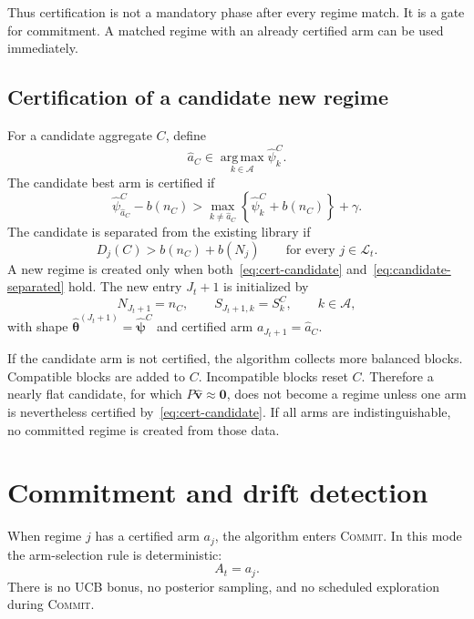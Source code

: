 \documentclass[11pt]{article}
\newcommand{\A}{\mathcal A}
\newcommand{\Lcal}{\mathcal L}
\newcommand{\argmax}{\operatorname*{arg\,max}}
\newcommand{\COMMIT}{\textsc{Commit}}
\begin{document}
Thus certification is not a mandatory phase after every regime match. It is a gate for commitment. A matched regime with an already certified arm can be used immediately.

\subsection{Certification of a candidate new regime}

For a candidate aggregate $C$, define
\begin{equation}
    \widehat a_C\in\argmax_{k\in\A}\widehat\psi^C_k.
\end{equation}
The candidate best arm is certified if
\begin{equation}
    \widehat\psi^C_{\widehat a_C}-b(n_C)
    >
    \max_{k\neq \widehat a_C}\left\{\widehat\psi^C_k+b(n_C)\right\}+\gamma.
    \label{eq:cert-candidate}
\end{equation}
The candidate is separated from the existing library if
\begin{equation}
    D_j(C)> b(n_C)+b(N_j)
    \qquad
    \text{for every }j\in\Lcal_t.
    \label{eq:candidate-separated}
\end{equation}
A new regime is created only when both~\eqref{eq:cert-candidate} and~\eqref{eq:candidate-separated} hold. The new entry $J_t+1$ is initialized by
\begin{equation}
    N_{J_t+1}=n_C,
    \qquad
    S_{J_t+1,k}=S^C_k,
    \qquad k\in\A,
\end{equation}
with shape $\widehat{\bm\theta}^{(J_t+1)}=\widehat{\bm\psi}^{C}$ and certified arm $a_{J_t+1}=\widehat a_C$.

If the candidate arm is not certified, the algorithm collects more balanced blocks. Compatible blocks are added to $C$. Incompatible blocks reset $C$. Therefore a nearly flat candidate, for which $P\widehat{\bm v}\approx\bm 0$, does not become a regime unless one arm is nevertheless certified by~\eqref{eq:cert-candidate}. If all arms are indistinguishable, no committed regime is created from those data.

\section{Commitment and drift detection}

When regime $j$ has a certified arm $a_j$, the algorithm enters \COMMIT. In this mode the arm-selection rule is deterministic:
\begin{equation}
    A_t=a_j.
    \label{eq:commit}
\end{equation}
There is no UCB bonus, no posterior sampling, and no scheduled exploration during \COMMIT.
\end{document}
